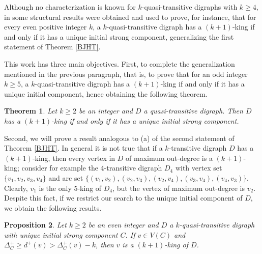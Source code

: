 \documentclass[preprint]{elsarticle}
\newtheorem{thm}{Theorem}[section]
\newtheorem{prop}[thm]{Proposition}
\begin{document}
Although no characterization is known for $k$-quasi-transitive digraphs with $k \ge 4$, in \cite{GS-HC} some structural results were obtained and used to prove, for instance, that for every even positive integer $k$, a $k$-quasi-transitive digraph has a $(k+1)$-king if and only if it has a unique initial strong component, generalizing the first statement of Theorem \ref{BJHT}.



This work has three main objectives.   First, to complete the generalization mentioned in the previous paragraph, that is, to prove that for an odd integer $k \ge 5$, a $k$-quasi-transitive digraph has a $(k+1)$-king if and only if it has a unique initial component, hence obtaining the following theorem.

\begin{thm} \label{genBJ}
Let $k \ge 2$ be an integer and $D$ a quasi-transitive digraph.   Then $D$ has a $(k+1)$-king if and only if it has a unique initial strong component.
\end{thm}

Second, we will prove a result analogous to (a) of the second statement of Theorem \ref{BJHT}.   In general it is not true that if a $k$-transitive digraph $D$ has a $(k+1)$-king, then every vertex in $D$ of maximum out-degree is a $(k+1)$-king; consider for example the $4$-transitive digraph $D_4$ with vertex set $\{ v_1, v_2, v_3, v_4 \}$ and arc set $\{ (v_1, v_2), (v_2, v_3), (v_2, v_4), (v_3, v_4), (v_4, v_3) \}$.   Clearly, $v_1$ is the only $5$-king of $D_4$, but the vertex of maximum out-degree is $v_2$.   Despite this fact, if we restrict our search to the unique initial component of $D$, we obtain the following results.



\begin{prop} \label{exis-deg-even-prop}
Let $k \ge 2$ be an even integer and $D$ a $k$-quasi-transitive digraph with unique initial strong component $C$.   If $v \in V(C)$ and $\Delta_C^+ \ge d^+ (v) > \Delta_C^+ (v) - k$, then $v$ is a $(k+1)$-king of $D$.
\end{prop}
\end{document}
